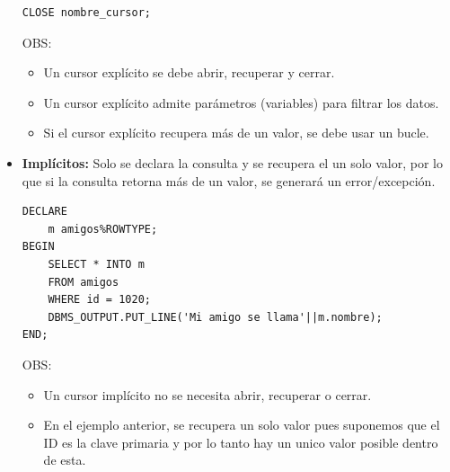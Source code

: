 \documentclass{templateNote}
\begin{document}
\begin{itemize}
    \begin{tcolorbox}[
        colframe=Celeste!100, %
        colback=Celeste!20,       %
        coltitle=black!100, %
        title=\textbf{PL/SQL}: \textit{Cerrar el cursor.}, %
    ]
        \begin{Verbatim}[breaklines=true]
CLOSE nombre_cursor;
        \end{Verbatim}
    \end{tcolorbox}
    OBS:
    \begin{itemize}
        \item Un cursor explícito se debe abrir, recuperar y cerrar.
        \item Un cursor explícito admite par\'ametros (variables) para filtrar los datos.
        \item Si el cursor explícito recupera más de un valor, se debe usar un bucle.
    \end{itemize}

    \newpage
    \item \textbf{Implícitos:} Solo se declara la consulta y se recupera el un solo valor, por lo que si la consulta retorna más de un valor, se generará un error/excepci\'on.
    \begin{tcolorbox}[
        colframe=Salmon!100, %
        colback=Salmon!20,       %
        coltitle=black!100, %
        title=\textbf{PL/SQL}: \textit{Cerrar el cursor.}, %
    ]
        \begin{verbatim}
DECLARE
    m amigos%ROWTYPE;
BEGIN
    SELECT * INTO m
    FROM amigos
    WHERE id = 1020;
    DBMS_OUTPUT.PUT_LINE('Mi amigo se llama'||m.nombre);
END;
        \end{verbatim}
    \end{tcolorbox}
    OBS:
    \begin{itemize}
        \item Un cursor implícito no se necesita abrir, recuperar o cerrar.
        \item En el ejemplo anterior, se recupera un solo valor pues suponemos que el ID es la clave primaria y por lo tanto hay un unico valor posible dentro de esta.
    \end{itemize}
\end{itemize}

\newpage
\end{document}

